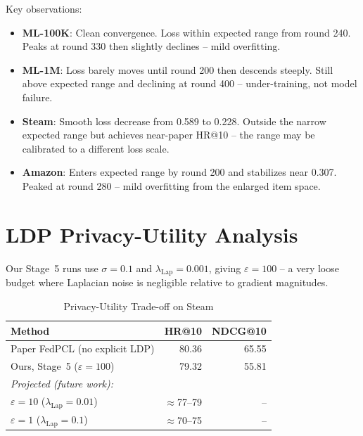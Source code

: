 \documentclass[10pt,twocolumn]{article}
\begin{document}
Key observations:
\begin{itemize}[leftmargin=1em,itemsep=2pt]
  \item \textbf{ML-100K}: Clean convergence. Loss within expected range
        from round 240. Peaks at round 330 then slightly declines --
        mild overfitting.
  \item \textbf{ML-1M}: Loss barely moves until round 200 then descends
        steeply. Still above expected range and declining at round 400
        -- under-training, not model failure.
  \item \textbf{Steam}: Smooth loss decrease from 0.589 to 0.228.
        Outside the narrow expected range but achieves near-paper
        HR@10 -- the range may be calibrated to a different loss scale.
  \item \textbf{Amazon}: Enters expected range by round 200 and
        stabilizes near 0.307. Peaked at round 280 -- mild overfitting
        from the enlarged item space.
\end{itemize}

\section{LDP Privacy-Utility Analysis}
\label{sec:ldp}

Our Stage~5 runs use $\sigma = 0.1$ and $\lambda_{\mathrm{Lap}} = 0.001$,
giving $\varepsilon = 100$ -- a very loose budget where Laplacian noise
is negligible relative to gradient magnitudes.

\begin{table}[H]
\centering
\caption{Privacy-Utility Trade-off on Steam}
\label{tab:ldp}
\setlength{\tabcolsep}{4pt}
\begin{tabular}{lrr}
\toprule
\textbf{Method} & \textbf{HR@10} & \textbf{NDCG@10} \\
\midrule
Paper FedPCL (no explicit LDP) & 80.36 & 65.55 \\
Ours, Stage~5 ($\varepsilon{=}100$) & 79.32 & 55.81 \\
\midrule
\multicolumn{3}{l}{\textit{Projected (future work):}} \\
$\varepsilon{=}10$ ($\lambda_{\mathrm{Lap}}{=}0.01$) & $\approx$77--79 & -- \\
$\varepsilon{=}1$ ($\lambda_{\mathrm{Lap}}{=}0.1$)  & $\approx$70--75 & -- \\
\bottomrule
\end{tabular}
\end{table}
\end{document}
